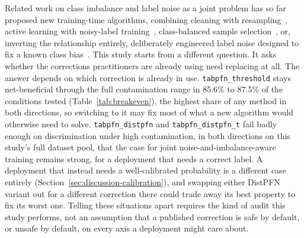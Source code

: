 Related work on class imbalance and label noise as a joint problem has so
far proposed new training-time algorithms, combining cleaning with
resampling~\cite{koziarski2020ccr}, active learning with noisy-label
training~\cite{khanal2024activelabel}, class-balanced sample
selection~\cite{liu2024imbalancednoisy}, or, inverting the relationship
entirely, deliberately engineered label noise designed to fix a known
class bias~\cite{hu2025beneficialnoise}. This study starts from a
different question. It asks whether the corrections practitioners are
already using need replacing at all. The answer depends on which
correction is already in use. \texttt{tabpfn\_threshold} stays
net-beneficial through the full contamination range in 85.6\% to 87.5\% of
the conditions tested (Table~\ref{tab:breakeven}), the highest share of any method in both
directions, so switching to it may fix most of what a new algorithm
would otherwise need to solve.
\texttt{tabpfn\_distpfn} and \texttt{tabpfn\_distpfn\_t} fail badly
enough on discrimination under high contamination, in both directions on
this study's full dataset pool, that the case for
joint noise-and-imbalance-aware training remains strong, for a
deployment that needs a correct label. A deployment that instead needs a
well-calibrated probability is a different case entirely
(Section~\ref{sec:discussion-calibration}), and swapping either DistPFN
variant out for a different correction there could trade away its best
property to fix its worst one. Telling these situations apart requires
the kind of audit this study performs, not an assumption that a
published correction is safe by default, or unsafe by default, on every
axis a deployment might care about.
